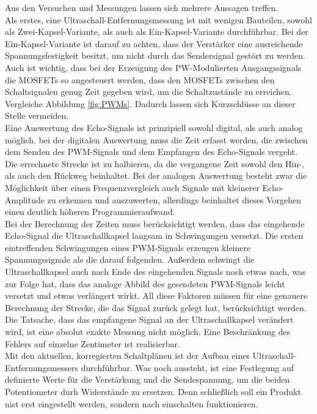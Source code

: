 Aus den Versuchen und Messungen lassen sich mehrere Aussagen treffen. \\
Als erstes, eine Ultraschall-Entfernungsmessung ist mit wenigen Bauteilen, sowohl als Zwei-Kapsel-Variante, als auch als Ein-Kapsel-Variante durchführbar. Bei der Ein-Kapsel-Variante ist darauf zu achten, dass der Verstärker eine ausreichende Spannungsfestigkeit besitzt, um nicht durch das Sendersignal gestört zu werden. Auch ist wichtig, dass bei der Erzeugung des PW-Modulierten Ausgangssignals die MOSFETs so angesteuert werden, dass den MOSFETs zwischen den Schaltsignalen genug Zeit gegeben wird, um die Schaltzustände zu erreichen. Vergleiche Abbildung \ref{fig:PWMs}. Dadurch lassen sich Kurzschlüsse an dieser Stelle vermeiden.\\
Eine Auswertung des Echo-Signals ist prinzipiell sowohl digital, als auch analog möglich. bei der digitalen Auswertung muss die Zeit erfasst werden, die zwischen dem Senden des PWM-Signals und dem Empfangen des Echo-Signals vergeht. Die errechnete Strecke ist zu halbieren, da die vergangene Zeit sowohl den Hin-, als auch den Rückweg beinhaltet. Bei der analogen Auswertung besteht zwar die Möglichkeit über einen Frequenzvergleich auch Signale mit kleinerer Echo-Amplitude zu erkennen und auszuwerten, allerdings beinhaltet dieses Vorgehen einen deutlich höheren Programmieraufwand.\\
Bei der Berechnung der Zeiten muss berücksichtigt werden, dass das eingehende Echo-Signal die Ultraschallkapsel langsam in Schwingungen versetzt. Die ersten eintreffenden Schwingungen eines PWM-Signals erzeugen kleinere Spannungssignale als die darauf folgenden. Außerdem schwingt die Ultraschallkapsel auch nach Ende des eingehenden Signals noch etwas nach, was zur Folge hat, dass das analoge Abbild des gesendeten PWM-Signals leicht versetzt und etwas verlängert wirkt. All diese Faktoren müssen für eine genauere Berechnung der Strecke, die das Signal zurück gelegt hat, berücksichtigt werden. Die Tatsache, dass das empfangene Signal an der Ultraschallkapsel verändert wird, ist eine absolut exakte Messung nicht möglich. Eine Beschränkung des Fehlers auf einzelne Zentimeter ist realisierbar.\\
Mit den aktuellen, korregierten Schaltplänen ist der Aufbau eines Ultraschall-Entfernungsmessers durchführbar. Was noch aussteht, ist eine Festlegung auf definierte Werte für die Verstärkung und die Sendespannung, um die beiden Potentiometer durh Widerstände zu ersetzen. Denn schließlich soll ein Produkt nist erst eingestellt werden, sondern nach einschalten funktionieren.